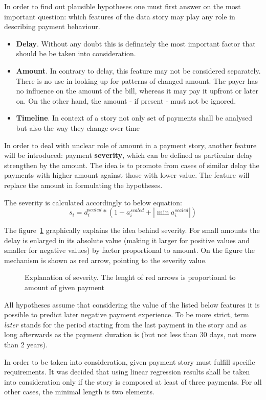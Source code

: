 \documentclass{article}
\begin{document}
In order to find out plausible hypotheses one must first answer on the most important question: which features of the
data story may play any role in describing payment behaviour.
\begin{itemize}
    \item \textbf{Delay}. Without any doubt this is definately the most important factor that should be be taken into consideration.
    \item \textbf{Amount}. In contrary to delay, this feature may not be considered separately. There is no use in looking up for patterns of changed amount. The payer has no influence on the amount of the bill, whereas it may pay it upfront or later on. On the other hand, the amount - if present - must not be ignored.
    \item \textbf{Timeline}. In context of a story not only set of payments shall be analysed but also the way they change over time
\end{itemize}
In order to deal with unclear role of amount in a payment story, another feature will be introduced: payment \textbf{severity},
which can be defined as particular delay strengthen by the amount.
The idea is to promote from cases of similar delay the payments with higher amount against those with lower value.
The feature will replace the amount in formulating the hypotheses.
\par
The severity is calculated accordingly to below equation:
\[s_i=d_i^{scaled}*(1+a_i^{scaled}+|\min{a_i^{scaled}}|)\]
\par
The figure\ \ref{fig:301_severity_explained} graphically explains the idea behind severity.
For small amounts the delay is enlarged in its absolute value (making it larger for positive values and smaller for negative values) by factor proportional to amount.
On the figure the mechanism is shown as red arrow, pointing to the severity value.

\begin{figure}[htbp!]
    \begin{center}
        
    \caption{Explanation of severity. The lenght of red arrows is proportional to amount of given payment}
    \label{fig:301_severity_explained}
    \end{center}
\end{figure}

All hypotheses assume that considering the value of the listed below features it is possible to predict later negative payment experience.
To be more strict, term \textit{later} stands for the period starting from the last payment in the story and as long afterwards
as the payment duration is (but not less than 30 days, not more than 2 years).
\par In order to be taken into consideration, given payment story must fulfill specific requirements.
 It was decided that using linear regression results shall be taken into consideration only if the story is composed at least of three payments.
For all other cases, the minimal length is two elements.
\end{document}
